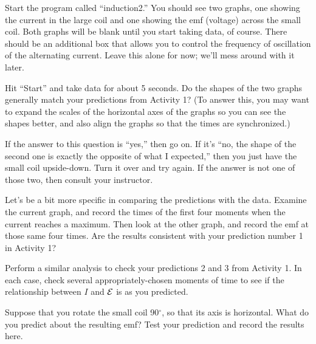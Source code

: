Start the program called ``induction2.'' You should see two graphs,
one showing the current in the large coil and one showing the emf (voltage)
across the small coil.  Both graphs will be blank until you start taking
data, of course.  There should be an additional box that allows you to control
the frequency of oscillation of the alternating current.  Leave this alone
for now; we'll mess around with it later.

Hit ``Start'' and take data for about 5 seconds.  Do the shapes of the
two graphs generally match your predictions from Activity 1? (To answer this, you may want to expand the scales of the horizontal axes of the graphs so you can see the shapes better, and also align the graphs so that the times are synchronized.) 

\vskip 1in

If the answer to this question is ``yes,'' then go on.  If it's ``no,
the shape of the second one is exactly the opposite of what I expected,''
then you just have the small coil upside-down.  Turn it over and 
try again.  If the answer is not one of those two, then consult your 
instructor.

Let's be a bit more specific in comparing the predictions
with the data.  Examine the current graph, and record the
times of the first four moments when the current reaches a maximum.
Then look at the other graph, and record the emf at those same four times.
Are the results consistent with your prediction number 1 in Activity 1?

\newpage

Perform a similar analysis to check your predictions 2 and 3 from Activity 1.
In each case, check several appropriately-chosen moments of time to see
if the relationship between $I$ and ${\cal E}$ is as you predicted.

\vskip 4in

Suppose that you rotate the small coil 90$^\circ$, so that its axis
is horizontal.  What do you predict about the resulting emf?
Test your prediction and record the results here.

\newpage

